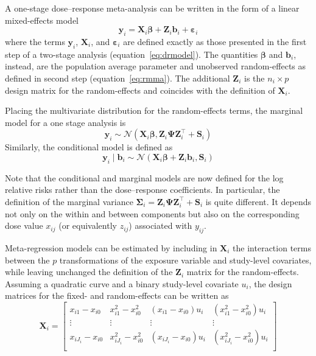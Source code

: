 \documentclass[11pt,a4paper,twoside,openany]{book}\usepackage{knitr}
\begin{document}
{A one-stage dose--response meta-analysis can be written in the form of a linear mixed-effects model
\begin{equation}
\mathbf{y}_{i} = \mathbf{X}_{i} \boldsymbol{\beta} + \mathbf{Z}_{i}  \mathbf{b}_i + \boldsymbol{\varepsilon}_{i}
\label{eq:onestage}
\end{equation}
\noindent where the terms $\mathbf{y}_{i}$, $\mathbf{X}_{i}$, and $\boldsymbol{\varepsilon}_{i}$ are defined exactly as those presented in the first step of a two-stage analysis (equation~\ref{eq:drmodel}). The quantities $\boldsymbol{\beta}$ and $\mathbf{b}_i$, instead, are the population average parameter and unobserved random-effects as defined in second step (equation~\ref{eq:rmma}). The additional $\mathbf{Z}_{i}$ is the $n_i \times p$ design matrix for the random-effects and coincides with the definition of $\mathbf{X}_{i}$.

\noindent Placing the multivariate distribution for the random-effects terms, the marginal model for a one stage analysis is
\begin{equation}
\mathbf{y}_{i} \sim \mathcal{N} \left( \mathbf{X}_{i} \boldsymbol{\beta},  \mathbf{Z}_{i} \boldsymbol{\Psi} \mathbf{Z}_{i}^\top  + \mathbf{S}_i \right)
\label{eq:marginal_os}
\end{equation}
\noindent Similarly, the conditional model is defined as
\begin{equation}
\mathbf{y}_{i} \mid \boldsymbol{b}_i \sim \mathcal{N} \left( \mathbf{X}_{i} \boldsymbol{\beta} + \mathbf{Z}_{i} \boldsymbol{b}_i,  \mathbf{S}_i \right)
\label{eq:conditional_os}
\end{equation}

\noindent Note that the conditional and marginal models are now defined for the log relative risks rather than the dose--response coefficients. In particular, the definition of the marginal variance $\boldsymbol{\Sigma}_i  = \mathbf{Z}_{i} \boldsymbol{\Psi} \mathbf{Z}_{i}^\top  + \mathbf{S}_i$ is quite different. It depends not only on the within and between components but also on the corresponding dose value $x_{ij}$ (or equivalently $z_{ij}$) associated with $y_{ij}$.

Meta-regression models can be estimated by including in $\mathbf{X}_{i}$ the interaction terms between the $p$ transformations of the exposure variable and study-level covariates, while leaving unchanged the definition of the $\mathbf{Z}_{i}$ matrix for the random-effects. Assuming a quadratic curve and a binary study-level covariate $u_i$, the design matrices for the fixed- and random-effects can be written as
\begin{equation*}
\mathbf{X}_i =
	\begin{bmatrix}
		x_{i1} - x_{i0}  & x_{i1}^2 - x_{i0}^2 & \left(x_{i1} - x_{i0}\right) u_i &  \left( x_{i1}^2 - x_{i0}^2\right) u_i \\
		\vdots & \vdots & \vdots & \vdots \\
		x_{iJ_i} - x_{i0}  & x_{iJ_i}^2 - x_{i0}^2 & \left(x_{iJ_i} - x_{i0}\right) u_i  & \left(x_{iJ_i}^2 - x_{i0}^2\right) u_i \\
	\end{bmatrix}
\end{equation*} 

}
\end{document}
